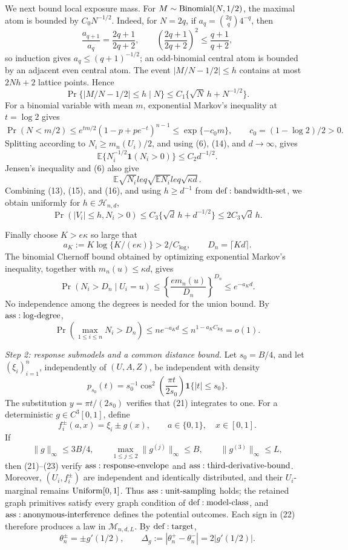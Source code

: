 We next bound local exposure mass.  For \(M\sim{\rm Binomial}(N,1/2)\), the maximal atom is bounded by \(C_0N^{-1/2}\).  Indeed, for \(N=2q\), if \(a_q={2q\choose q}4^{-q}\), then
\[
 \frac{a_{q+1}}{a_q}=\frac{2q+1}{2q+2},
 \qquad
 \left(\frac{2q+1}{2q+2}\right)^2\leq\frac{q+1}{q+2},
\tag{12}
\]
so induction gives \(a_q\leq(q+1)^{-1/2}\); an odd-binomial central atom is bounded by an adjacent even central atom.  The event \(|M/N-1/2|\leq h\) contains at most \(2Nh+2\) lattice points.  Hence
\[
 \Pr\{|M/N-1/2|\leq h\mid N\}
 \leq C_1\{\sqrt N\,h+N^{-1/2}\}.
\tag{13}
\]
For a binomial variable with mean \(m\), exponential Markov's inequality at \(t=\log2\) gives
\[
 \Pr(N<m/2)
 \leq e^{tm/2}(1-p+pe^{-t})^{n-1}
 \leq\exp\{-c_0m\},
 \qquad c_0=(1-\log2)/2>0.
\tag{14}
\]
Splitting according to \(N_i\geq m_n(U_i)/2\), and using (6), (14), and \(d\to\infty\), gives
\[
 \mathbb E\{N_i^{-1/2}\mathbf1(N_i>0)\}
 \leq C_2d^{-1/2}.
\tag{15}
\]
Jensen's inequality and (6) also give
\[
 \mathbb E\sqrt{N_i}leq\sqrt{\mathbb EN_i}leq\sqrt{\kappa d}.
\tag{16}
\]
Combining (13), (15), and (16), and using \(h\geq d^{-1}\) from \({\rm def:bandwidth\text{-}set}\), we obtain uniformly for \(h\in\mathcal H_{n,d}\),
\[
 \Pr(|V_i|\leq h,N_i>0)
 \leq C_3\{\sqrt d\,h+d^{-1/2}\}
 \leq2C_3\sqrt d\,h.
\tag{17}
\]

Finally choose \(K>e\kappa\) so large that
\[
 a_K:=K\log\{K/(e\kappa)\}>2/C_{\log},
 \qquad D_n=\lceil Kd\rceil.
\tag{18}
\]
The binomial Chernoff bound obtained by optimizing exponential Markov's inequality, together with \(m_n(u)\leq\kappa d\), gives
\[
 \Pr(N_i>D_n\mid U_i=u)
 \leq\left\{\frac{e m_n(u)}{D_n}\right\}^{D_n}
 \leq e^{-a_Kd}.
\tag{19}
\]
No independence among the degrees is needed for the union bound.  By \({\rm ass:log\text{-}degree}\),
\[
 \Pr\left(\max_{1\leq i\leq n}N_i>D_n\right)
 \leq ne^{-a_Kd}
 \leq n^{1-a_KC_{\log}}=o(1).
\tag{20}
\]

\textit{Step 2: response submodels and a common distance bound.}
Let \(s_0=B/4\), and let \((\xi_i)_{i=1}^n\), independently of \((U,A,Z)\), be independent with density
\[
 p_{s_0}(t)=s_0^{-1}\cos^2\!\left(\frac{\pi t}{2s_0}\right)
 \mathbf1\{|t|\leq s_0\}.
\tag{21}
\]
The substitution \(y=\pi t/(2s_0)\) verifies that (21) integrates to one.  For a deterministic \(g\in C^3[0,1]\), define
\[
 f_i^\pm(a,x)=\xi_i\pm g(x),
 \qquad a\in\{0,1\},\quad x\in[0,1].
\tag{22}
\]
If
\[
 \|g\|_\infty\leq3B/4,
 \qquad
 \max_{1\leq j\leq2}\|g^{(j)}\|_\infty\leq B,
 \qquad
 \|g^{(3)}\|_\infty\leq L,
\tag{23}
\]
then (21)--(23) verify \({\rm ass:response\text{-}envelope}\) and \({\rm ass:third\text{-}derivative\text{-}bound}\).  Moreover, \((U_i,f_i^\pm)\) are independent and identically distributed, and their \(U_i\)-marginal remains \({\rm Uniform}[0,1]\).  Thus \({\rm ass:unit\text{-}sampling}\) holds; the retained graph primitives satisfy every graph condition of \({\rm def:model\text{-}class}\), and \({\rm ass:anonymous\text{-}interference}\) defines the potential outcomes.  Each sign in (22) therefore produces a law in \(\mathcal M_{n,d,L}\).  By \({\rm def:target}\),
\[
 \theta_n^\pm=\pm g'(1/2),
 \qquad
 \Delta_g:=|\theta_n^+-\theta_n^-|=2|g'(1/2)|.
\tag{24}
\]

